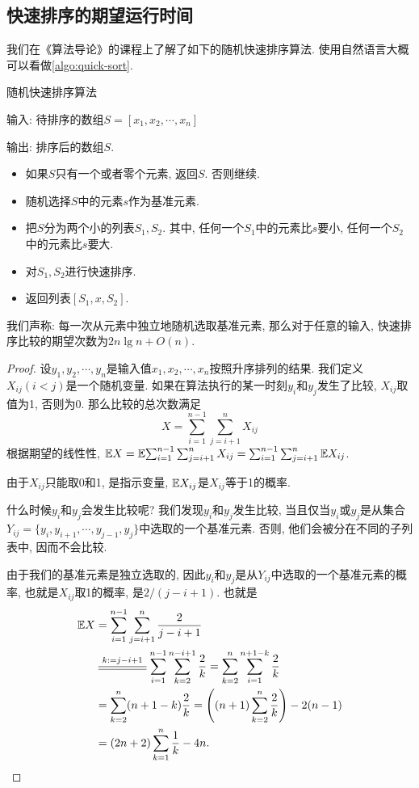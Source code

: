 \documentclass{ctexart}
\begin{document}
\subsection{快速排序的期望运行时间}

我们在《算法导论》的课程上了解了如下的随机快速排序算法. 使用自然语言大概可以看做\cref{algo:quick-sort}. 
\begin{algorithm}
    \caption{随机快速排序算法}
    \label{algo:quick-sort}
    {输入: 待排序的数组$S=[x_1, x_2, \cdots, x_n]$}
    
    {输出: 排序后的数组$S$.}
    \begin{itemize}
        \item 如果$S$只有一个或者零个元素, 返回$S$. 否则继续. 
        \item 随机选择$S$中的元素$s$作为基准元素. 
        \item 把$S$分为两个小的列表$S_1, S_2$. 其中, 任何一个$S_1$中的元素比$s$要小, 任何一个$S_2$中的元素比$s$要大.
        \item 对$S_1, S_2$进行快速排序. 
        \item 返回列表$[S_1, x, S_2]$.
    \end{itemize}
\end{algorithm}

我们声称: 每一次从元素中独立地随机选取基准元素, 那么对于任意的输入, 快速排序比较的期望次数为$2n\lg n + O(n)$. 

\begin{proof}
    设$y_1, y_2, \cdots, y_n$是输入值$x_1, x_2, \cdots, x_n$按照升序排列的结果. 我们定义$X_{ij}(i<j)$是一个随机变量. 如果在算法执行的某一时刻$y_i$和$y_j$发生了比较, $X_{ij}$取值为1, 否则为0. 那么比较的总次数满足
    $$
    X=\sum_{i=1}^{n-1}\sum_{j=i+1}^n X_{ij}
    $$
    根据期望的线性性, $\mathbb E {X}=\mathbb E {\sum_{i=1}^{n-1}\sum_{j=i+1}^n X_{ij}}=\sum_{i=1}^{n-1}\sum_{j=i+1}^n \mathbb E {X_{ij}}$. 

    由于$X_{ij}$只能取0和1, 是指示变量, $\mathbb E {X_{ij}}$是$X_{ij}$等于1的概率. 

    什么时候$y_i$和$y_j$会发生比较呢? 我们发现$y_i$和$y_j$发生比较, 当且仅当$y_i$或$y_j$是从集合$Y_{ij}=\{y_i, y_{i+1}, \cdots, y_{j-1},y_j\}$中选取的一个基准元素. 否则, 他们会被分在不同的子列表中, 因而不会比较. 

    由于我们的基准元素是独立选取的, 因此$y_i$和$y_j$是从$Y_{ij}$中选取的一个基准元素的概率, 也就是$X_{ij}$取1的概率, 是$2/(j-i+1)$. 也就是
    $$
    \begin{aligned}
        \E{X}&=\sum_{i=1}^{n-1} \sum_{j=i+1}^{n} \frac 2{j-i+1}\\
        &\varsub{k:=j-i+1}{1.5cm} \sum_{i=1}^{n-1}\sum_{k=2}^{n-i+1} \frac 2k = \sum_{k=2}^n \sum_{i=1}^{n+1-k} \frac 2k \\ 
        &= \sum_{k=2}^n (n+1-k) \frac 2k = \left((n+1)\sum_{k=2}^n \frac 2k\right)-2(n-1) \\
        &= (2n+2) \sum_{k=1}^n \frac 1k - 4n.
    \end{aligned} 
    $$
\end{proof}
\end{document}
